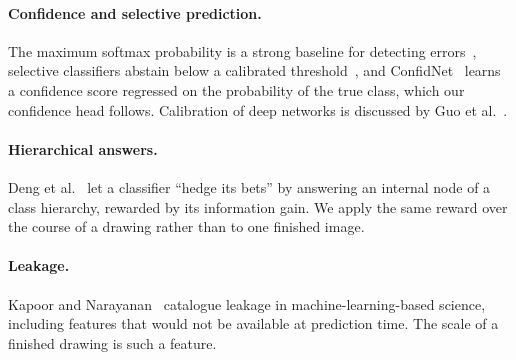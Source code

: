 \paragraph{Confidence and selective prediction.}
The maximum softmax probability is a strong baseline for detecting errors~\cite{hendrycks2017baseline},
selective classifiers abstain below a calibrated threshold~\cite{geifman2017selective}, and
ConfidNet~\cite{corbiere2019confidnet} learns a confidence score regressed on the probability of
the true class, which our confidence head follows. Calibration of deep networks is discussed by
Guo et al.~\cite{guo2017calibration}.

\paragraph{Hierarchical answers.}
Deng et al.~\cite{deng2012hedging} let a classifier ``hedge its bets'' by answering an internal
node of a class hierarchy, rewarded by its information gain. We apply the same reward over the
course of a drawing rather than to one finished image.

\paragraph{Leakage.}
Kapoor and Narayanan~\cite{kapoor2023leakage} catalogue leakage in machine-learning-based science,
including features that would not be available at prediction time. The scale of a finished
drawing is such a feature.
